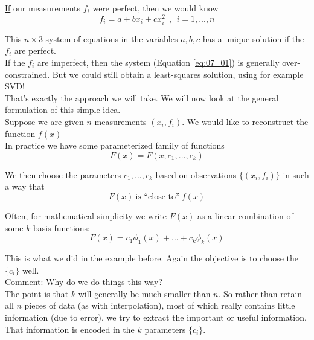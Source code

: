 {\underline{If} our measurements $f_i$ were perfect, then we would know
\begin{equation}
    \label{eq:07_01}
    f_i = a + b x_i + c x_i^2~~,~~ i = 1, ... , n
\end{equation}

This $n \times 3$ system of equations in the variables $a, b, c$ has a unique solution if the $f_i$ are perfect. \\

If the $f_i$ are imperfect, then the system (Equation \ref{eq:07_01}) is generally over-constrained. But we could still obtain a least-squares solution, using for example SVD! \\

That's exactly the approach we will take. We will now look at the general formulation of this simple idea. \\

Suppose we are given $n$ measurements $(x_i, f_i)$. We would like to reconstruct the function $f(x)$ \\

In practice we have some parameterized family of functions 
\begin{equation*}
    F(x) = F(x; c_1, ... , c_k)
\end{equation*}

We then choose the parameters $c_1, ... , c_k$ based on observations $\{(x_i, f_i)\}$ in such a way that
\begin{equation*}
    F(x)~\text{is ``close to''}~f(x)
\end{equation*}

Often, for mathematical simplicity we write $F(x)$ as a linear combination of some $k$ basis functions:
\begin{equation*}
    F(x) = c_1 \phi_1(x) + ... + c_k \phi_k(x)
\end{equation*}

This is what we did in the example before. Again the objective is to choose the $\{c_i\}$ well.\\

\underline{Comment:} Why do we do things this way? \\

The point is that $k$ will generally be much smaller than $n$. So rather than retain all $n$ pieces of data (as with interpolation), most of which really contains little information (due to error), we try to extract the important or useful information. That information is encoded in the $k$ parameters $\{c_i\}$.\\

}
